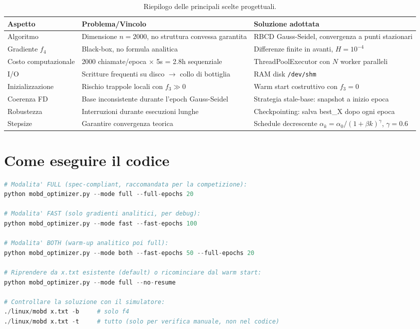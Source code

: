 \documentclass[12pt,a4paper]{article}
\theoremstyle{definition}
\begin{document}
\begin{table}[h]
\centering
\renewcommand{\arraystretch}{1.4}
\begin{tabular}{@{}p{}p{}p{}@{}}
\toprule
\textbf{Aspetto} & \textbf{Problema/Vincolo} & \textbf{Soluzione adottata} \\
\midrule
Algoritmo & Dimensione $n=2000$, no struttura convessa garantita &
  RBCD Gauss-Seidel, convergenza a punti stazionari \\
Gradiente $f_4$ & Black-box, no formula analitica &
  Differenze finite in avanti, $H=10^{-4}$ \\
Costo computazionale & 2000 chiamate/epoca $\times$ 5s = 2.8h sequenziale &
  ThreadPoolExecutor con $N$ worker paralleli \\
I/O & Scritture frequenti su disco $\to$ collo di bottiglia &
  RAM disk \texttt{/dev/shm} \\
Inizializzazione & Rischio trappole locali con $f_3 \gg 0$ &
  Warm start costruttivo con $f_3=0$ \\
Coerenza FD & Base inconsistente durante l'epoch Gauss-Seidel &
  Strategia stale-base: snapshot a inizio epoca \\
Robustezza & Interruzioni durante esecuzioni lunghe &
  Checkpointing: salva best\_X dopo ogni epoca \\
Stepsize & Garantire convergenza teorica &
  Schedule decrescente $\alpha_k = \alpha_0/(1+\beta k)^\gamma$, $\gamma=0.6$ \\
\bottomrule
\end{tabular}
\caption{Riepilogo delle principali scelte progettuali.}
\end{table}

\section{Come eseguire il codice}

\begin{lstlisting}[language=Python]
# Modalita' FULL (spec-compliant, raccomandata per la competizione):
python mobd_optimizer.py --mode full --full-epochs 20

# Modalita' FAST (solo gradienti analitici, per debug):
python mobd_optimizer.py --mode fast --fast-epochs 100

# Modalita' BOTH (warm-up analitico poi full):
python mobd_optimizer.py --mode both --fast-epochs 50 --full-epochs 20

# Riprendere da x.txt esistente (default) o ricominciare dal warm start:
python mobd_optimizer.py --mode full --no-resume

# Controllare la soluzione con il simulatore:
./linux/mobd x.txt -b     # solo f4
./linux/mobd x.txt -t     # tutto (solo per verifica manuale, non nel codice)
\end{lstlisting}
\end{document}
